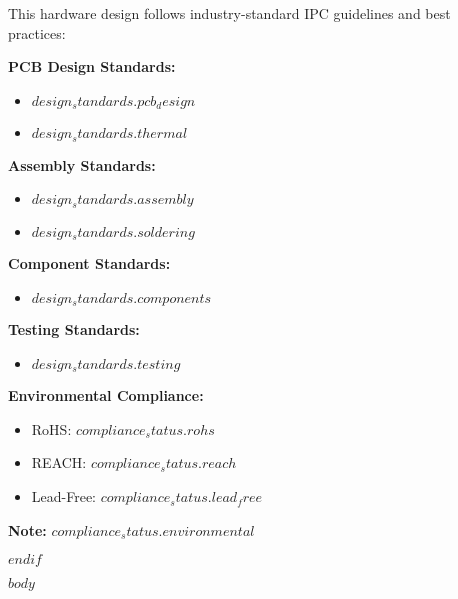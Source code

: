 \documentclass[11pt,a4paper]{article}
\begin{document}
\begin{tcolorbox}[
    colback=blue!5!white,
    colframe=blue!50!black,
    title=IPC Standards Reference,
    fonttitle=\bfseries
]

This hardware design follows industry-standard IPC guidelines and best practices:

\vspace{0.3cm}
\textbf{PCB Design Standards:}
\begin{itemize}
    \item $design_standards.pcb_design$
    \item $design_standards.thermal$
\end{itemize}

\textbf{Assembly Standards:}
\begin{itemize}
    \item $design_standards.assembly$
    \item $design_standards.soldering$
\end{itemize}

\textbf{Component Standards:}
\begin{itemize}
    \item $design_standards.components$
\end{itemize}

\textbf{Testing Standards:}
\begin{itemize}
    \item $design_standards.testing$
\end{itemize}

\end{tcolorbox}

\vspace{0.5cm}
\begin{tcolorbox}[
    colback=orange!5!white,
    colframe=orange!50!black,
    title=Compliance Status (Development Phase),
    fonttitle=\bfseries
]

\textbf{Environmental Compliance:}
\begin{itemize}
    \item RoHS: $compliance_status.rohs$
    \item REACH: $compliance_status.reach$
    \item Lead-Free: $compliance_status.lead_free$
\end{itemize}

\textbf{Note:} $compliance_status.environmental$

\end{tcolorbox}
\newpage
$endif$

$body$
\end{document}
